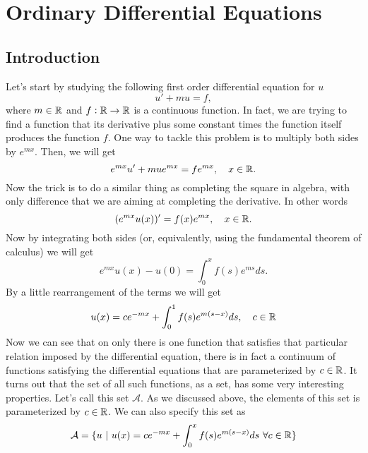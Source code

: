 \chapter{Ordinary Differential Equations}

\section{Introduction}

Let's start by studying the following first order differential equation for $u$
\[ u' + mu = f, \tag{1}\]
where $m\in \mathbb{R}$ and $f:\mathbb{R}\to\mathbb{R}$ is a continuous function. In fact, we are trying to find a function that its derivative plus some constant times the function itself produces the function $f$. One way to tackle this problem is to multiply both sides by $e^{mx}$. Then, we will get
\[ e^{mx}u' + mue^{mx} = f e^{mx},\quad x\in \mathbb{R}. \]
Now the trick is to do a similar thing as completing the square in algebra, with only difference that we are aiming at completing the derivative. In other words
\[ (e^{mx} u(x))' = f(x)e^{mx}, \quad x\in\mathbb{R}. \]
Now by integrating both sides (or, equivalently, using the fundamental theorem of calculus) we will get
\[ e^{mx}u(x) - u(0) = \int_{0}^{x}f(s)e^{ms} ds. \]
By a little rearrangement of the terms we will get
\[ u(x) = ce^{-mx} + \int_{0}^{1}f(s)e^{m(s-x)}ds, \quad c \in \mathbb{R} \]
Now we can see that on only there is one function that satisfies that particular relation imposed by the differential equation, there is in fact a continuum of functions satisfying the differential equations that are parameterized by $c\in \mathbb{R}$. It turns out that the set of all such functions, as a set, has some very interesting properties. Let's call this set $\mathcal{A}$. As we discussed above, the elements of this set is parameterized by $c\in\mathbb{R}$. We can also specify this set as
\begin{equation*}
	\mathcal{A} = \{u\ |\ u(x)=ce^{-mx} + \int_{0}^{x}f(s)e^{m(s-x)}ds\ \forall c\in \mathbb{R}\}
\end{equation*}

